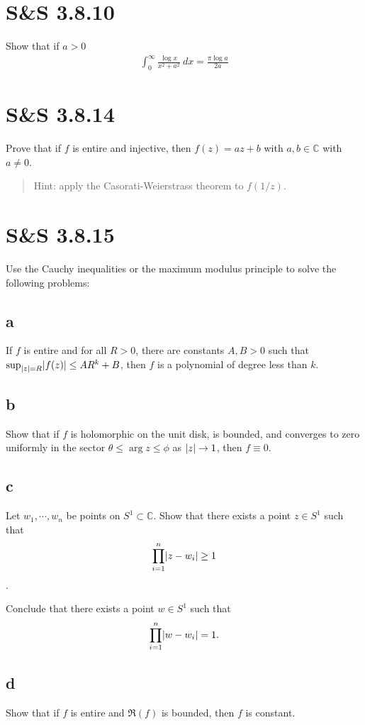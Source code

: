 \documentclass{scrreport}
\DeclarePairedDelimiter\abs{\lvert}{\rvert}%
\begin{document}
\section{S&S 3.8.10}
Show that if $a> 0$
\begin{align}
\int_0^{\infty} \frac{\log x}{x^2 + a^2} ~dx =\frac{\pi \log a}{2a}
\end{align}

\section{S&S 3.8.14}
Prove that if $f$ is entire and injective, then $f(z) = az + b$ with $a,b\in \mathbb{C}$ with $a\neq 0$.

\begin{quote}
  Hint: apply the Casorati-Weierstrass theorem to $f(1/z)$.  
\end{quote}


\section{S&S 3.8.15}
Use the Cauchy inequalities or the maximum modulus principle to solve the following problems:

\subsection{a}
If $f$ is entire and for all $R> 0$, there are constants $A, B > 0$ such that $\sup_{\abs{z} = R} \abs{f(z)} \leq AR^k + B$, then $f$ is a polynomial of degree less than $k$.

\subsection{b}
Show that if $f$ is holomorphic on the unit disk, is bounded, and converges to zero uniformly in the sector $\theta \leq \arg z \leq \phi$ as $\abs{z} \to 1$, then $f \equiv 0$.

\subsection{c}
Let $w_1, \cdots, w_n$ be points on $S^1 \subset\mathbb{C}$. Show that there exists a point $z \in S^1$ such that 
$$
\prod_{i=1}^n \abs{z-w_i} \geq 1
$$.

Conclude that there exists a point $w\in S^1$ such that 
$$
\prod_{i=1}^n \abs{w-w_i} = 1.
$$ 

\subsection{d}
Show that if $f$ is entire and $\Re(f)$ is bounded, then $f$ is constant.
\end{document}

